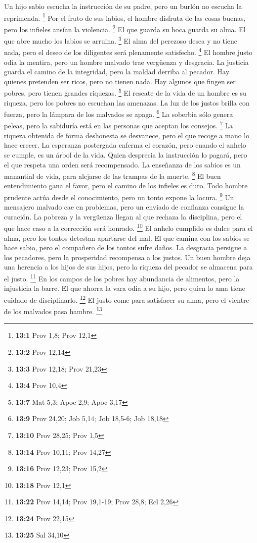  Un hijo sabio escucha la instrucción de su padre, pero un
burlón no escucha la reprimenda. \footnote{\textbf{13:1} Prov 1,8; Prov
  12,1}  Por el fruto de sus labios, el hombre disfruta de
las cosas buenas, pero los infieles ansían la violencia. \footnote{\textbf{13:2}
  Prov 12,14}  El que guarda su boca guarda su alma. El
que abre mucho los labios se arruina. \footnote{\textbf{13:3} Prov
  12,18; Prov 21,23}  El alma del perezoso desea y no
tiene nada, pero el deseo de los diligentes será plenamente satisfecho.
\footnote{\textbf{13:4} Prov 10,4}  El hombre justo odia
la mentira, pero un hombre malvado trae vergüenza y desgracia.
 La justicia guarda el camino de la integridad, pero la
maldad derriba al pecador.  Hay quienes pretenden ser
ricos, pero no tienen nada. Hay algunos que fingen ser pobres, pero
tienen grandes riquezas. \footnote{\textbf{13:7} Mat 5,3; Apoc 2,9; Apoc
  3,17}  El rescate de la vida de un hombre es su riqueza,
pero los pobres no escuchan las amenazas.  La luz de los
justos brilla con fuerza, pero la lámpara de los malvados se apaga.
\footnote{\textbf{13:9} Prov 24,20; Job 5,14; Job 18,5-6; Job 18,18}
 La soberbia sólo genera peleas, pero la sabiduría está
en las personas que aceptan los consejos. \footnote{\textbf{13:10} Prov
  28,25; Prov 1,5}  La riqueza obtenida de forma
deshonesta se desvanece, pero el que recoge a mano lo hace crecer.
 La esperanza postergada enferma el corazón, pero cuando
el anhelo se cumple, es un árbol de la vida.  Quien
desprecia la instrucción lo pagará, pero el que respeta una orden será
recompensado.  La enseñanza de los sabios es un manantial
de vida, para alejarse de las trampas de la muerte. \footnote{\textbf{13:14}
  Prov 10,11; Prov 14,27}  El buen entendimiento gana el
favor, pero el camino de los infieles es duro.  Todo
hombre prudente actúa desde el conocimiento, pero un tonto expone la
locura. \footnote{\textbf{13:16} Prov 12,23; Prov 15,2} 
Un mensajero malvado cae en problemas, pero un enviado de confianza
consigue la curación.  La pobreza y la vergüenza llegan
al que rechaza la disciplina, pero el que hace caso a la corrección será
honrado. \footnote{\textbf{13:18} Prov 12,1}  El anhelo
cumplido es dulce para el alma, pero los tontos detestan apartarse del
mal.  El que camina con los sabios se hace sabio, pero el
compañero de los tontos sufre daños.  La desgracia
persigue a los pecadores, pero la prosperidad recompensa a los justos.
 Un buen hombre deja una herencia a los hijos de sus
hijos, pero la riqueza del pecador se almacena para el justo.
\footnote{\textbf{13:22} Prov 14,14; Prov 19,1-19; Prov 28,8; Ecl 2,26}
 En los campos de los pobres hay abundancia de alimentos,
pero la injusticia la barre.  El que ahorra la vara odia
a su hijo, pero quien lo ama tiene cuidado de disciplinarlo. \footnote{\textbf{13:24}
  Prov 22,15}  El justo come para satisfacer su alma,
pero el vientre de los malvados pasa hambre. \footnote{\textbf{13:25}
  Sal 34,10}


